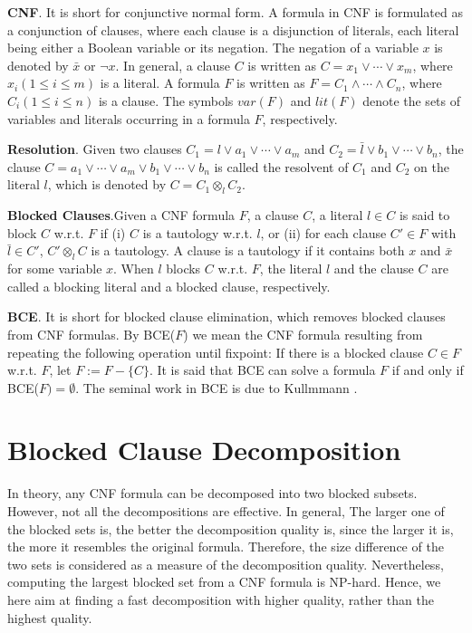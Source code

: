 \documentclass{llncs}
\begin{document}
\vspace{0.5em}
\noindent \textbf{CNF}. It is short for conjunctive
normal form. A formula in CNF is formulated as a conjunction of
clauses, where each clause is a disjunction of literals, each
literal being either a Boolean variable or its negation. The
negation of a variable $x$ is denoted by $\bar{x}$ or $\neg x$.
 In general, a clause $C$ is written as $C = x_1 \vee
\cdots \vee x_m$, where $x_i (1 \leq i \leq m)$ is a literal. A
formula $F$ is written as $F = C_1 \wedge \cdots \wedge C_n $, where
$C_i (1 \leq i \leq n)$ is a clause. The symbols $var(F)$ and
$lit(F)$ denote the sets of variables and literals occurring in a
formula $F$, respectively.

\vspace{0.5em}

\noindent \textbf{Resolution}. Given two clauses $C_1 = l \vee a_1
\vee \cdots \vee a_m$ and $C_2 = \bar{l} \vee b_1 \vee\cdots \vee
b_n$, the clause $C = a_1 \vee \cdots \vee a_m \vee b_1 \vee \cdots
\vee b_n$ is called the resolvent of $C_1$ and $C_2$ on the literal
$l$,  which is denoted by $C = C_1 {\otimes}_l C_2$.

\vspace{0.5em}

\noindent \textbf{Blocked Clauses}.Given a CNF formula $F$, a clause
$C$, a literal $l \in C$ is said to block $C$ w.r.t. $F$ if (i) $C$
is a tautology w.r.t. $l$,  or (ii) for each clause $C' \in F$ with
$\bar{l} \in C'$, $C' {\otimes}_l C$ is a tautology. A clause is a
tautology if it contains both $x$ and $\bar{x}$ for some variable
$x$. When $l$ blocks $C$ w.r.t. $F$, the literal $l$ and the clause
$C$ are called a blocking literal and a blocked clause,
respectively.

\vspace{0.5em} \noindent \textbf{BCE}. It is short for blocked
clause elimination, which removes blocked clauses from CNF formulas.
By BCE($F$) we mean the CNF formula resulting from repeating the
following operation until fixpoint: If there is a blocked clause $C
\in F$ w.r.t. $F$, let $F := F - \{C\}$. It is said that BCE can
solve a formula $F$ if and only if BCE($F) = \emptyset$. The seminal
work in BCE is due to Kullmmann \cite{BCE:99}.

\section{Blocked Clause Decomposition}

In theory,  any CNF formula can be decomposed into two blocked
subsets. However, not all the decompositions are effective. In
general, The larger one of the blocked sets is, the better the
decomposition quality is, since the larger it is, the more it
resembles the original formula. Therefore, the size difference of
the two sets is considered as a measure of the decomposition
quality. Nevertheless, computing the largest blocked set from a CNF
formula is NP-hard. Hence, we here aim at finding a fast
decomposition with higher quality, rather than the highest quality.
\end{document}
